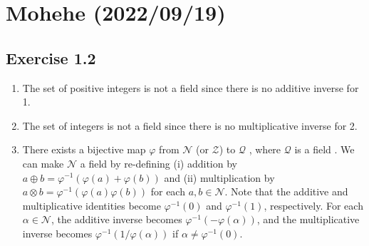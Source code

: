 \documentclass{article}
\theoremstyle{thmstyleone}
\theoremstyle{thmstyletwo}
\theoremstyle{thmstylethree}
\newcommand\Z{\mathcal Z}
\newcommand\N{\mathcal N}
\newcommand\Q{\mathcal Q}
\begin{document}
\section{Mohehe (2022/09/19)}
\subsection{Exercise 1.2}
\begin{enumerate}[label = (\alph*)]
  \item The set of positive integers is not a field since there is no additive inverse for 1.
  \item The set of integers is not a field since there is no multiplicative inverse for 2.
  \item There exists a bijective map $\varphi$ from $\N$ (or $\Z$) to $\Q$ \cite{Q_countable}, where $\Q$ is a field \cite{Q_field}.
  	We can make $\N$ a field by re-defining (i) addition by $a \oplus b = \varphi^{-1} (\varphi(a) + \varphi(b))$ and (ii) multiplication by $a \otimes b = \varphi^{-1}(\varphi(a)\varphi(b))$ for each $a, b \in \N$.
    Note that the additive and multiplicative identities become $\varphi^{-1}(0)$ and $\varphi^{-1}(1)$, respectively.
    For each $\alpha\in\N$, the additive inverse becomes $\varphi^{-1}(-\varphi(\alpha))$, and the multiplicative inverse becomes $\varphi^{-1}(1/\varphi(\alpha))$ if $\alpha\ne\varphi^{-1}(0)$.
    

\end{enumerate}
\end{document}
